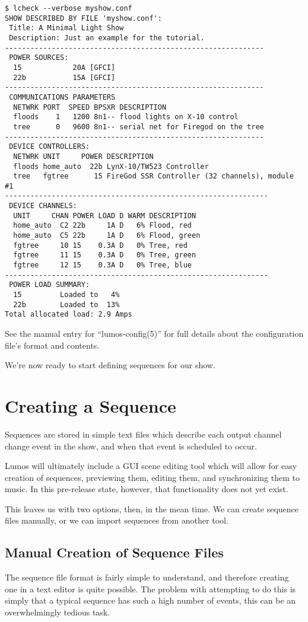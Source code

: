 \documentclass{article}
\begin{document}
\begin{verbatim}
$ lcheck --verbose myshow.conf
SHOW DESCRIBED BY FILE 'myshow.conf':
 Title: A Minimal Light Show
 Description: Just an example for the tutorial.
-------------------------------------------------------------
 POWER SOURCES:
  15            20A [GFCI]
  22b           15A [GFCI]
-------------------------------------------------------------
 COMMUNICATIONS PARAMETERS
  NETWRK PORT  SPEED BPSXR DESCRIPTION
  floods    1   1200 8n1-- flood lights on X-10 control
  tree      0   9600 8n1-- serial net for Firegod on the tree
-------------------------------------------------------------
 DEVICE CONTROLLERS:
  NETWRK UNIT     POWER DESCRIPTION
  floods home_auto  22b LynX-10/TW523 Controller
  tree   fgtree      15 FireGod SSR Controller (32 channels), module #1
--------------------------------------------------------------
 DEVICE CHANNELS:
  UNIT     CHAN POWER LOAD D WARM DESCRIPTION
  home_auto  C2 22b     1A D   6% Flood, red
  home_auto  C5 22b     1A D   6% Flood, green
  fgtree     10 15    0.3A D   0% Tree, red
  fgtree     11 15    0.3A D   0% Tree, green
  fgtree     12 15    0.3A D   0% Tree, blue
--------------------------------------------------------------
 POWER LOAD SUMMARY:
  15         Loaded to   4%
  22b        Loaded to  13%
Total allocated load: 2.9 Amps
\end{verbatim}

See the manual entry for ``lumos-config(5)'' for full details about the
configuration file's format and contents.

We're now ready to start defining sequences for our show.

\section{Creating a Sequence}
Sequences are stored in simple text files which describe each output
channel change event in the show, and when that event is scheduled to
occur.  

Lumos will ultimately include a GUI scene editing tool which will allow for
easy creation of sequences, previewing them, editing them, and synchronizing
them to music.  In this pre-release state, however, that functionality does
not yet exist.

This leaves us with two options, then, in the mean time.  We can create 
sequence files manually, or we can import sequences from another tool.

\subsection{Manual Creation of Sequence Files}
The sequence file format is fairly simple to understand, and therefore 
creating one in a text editor is quite possible.  The problem with attempting
to do this is simply that a typical sequence has such a high number of events,
this can be an overwhelmingly tedious task.
\end{document}
